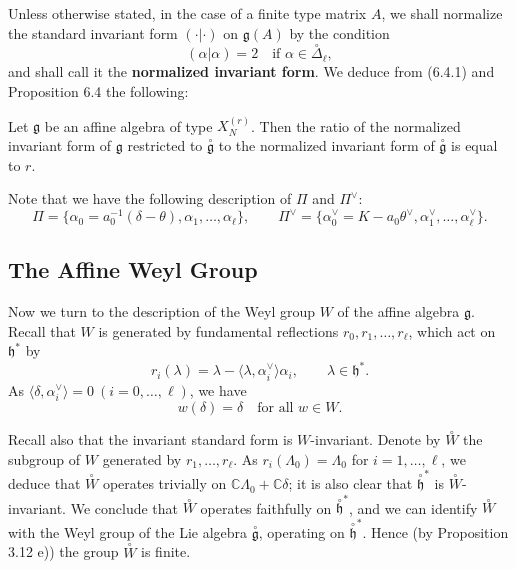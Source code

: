 \documentclass[12pt]{article}
\begin{document}
Unless otherwise stated, in the case of a finite type matrix $A$, we shall 
normalize the standard invariant form $(\cdot|\cdot)$ on $\mathfrak{g}(A)$ by the condition
\begin{equation}
(\alpha|\alpha) = 2 \quad \text{if } \alpha \in \overset{\circ}{\Delta}_\ell,
\tag{6.4.2}
\end{equation}
and shall call it the \textbf{normalized invariant form}. We deduce from (6.4.1) 
and Proposition 6.4 the following:

\begin{corollary}[6.4]
Let $\mathfrak{g}$ be an affine algebra of type $X_N^{(r)}$. Then the ratio 
of the normalized invariant form of $\mathfrak{g}$ restricted to $\overset{\circ}{\mathfrak{g}}$ 
to the normalized invariant form of $\overset{\circ}{\mathfrak{g}}$ is equal to $r$.
\end{corollary}

Note that we have the following description of $\Pi$ and $\Pi^\vee$:
\[
\Pi = \{\alpha_0 = a_0^{-1}(\delta-\theta), \alpha_1, \dots, \alpha_\ell\},
\qquad
\Pi^\vee = \{\alpha_0^\vee = K - a_0 \theta^\vee, \alpha_1^\vee, \dots, \alpha_\ell^\vee\}.
\]



\subsection{The Affine Weyl Group}
Now we turn to the description of the Weyl group $W$ of the affine 
algebra $\mathfrak{g}$. Recall that $W$ is generated by fundamental reflections 
$r_0, r_1, \dots, r_\ell$, which act on $\mathfrak{h}^*$ by
\[
r_i(\lambda) = \lambda - \langle \lambda, \alpha_i^\vee \rangle \alpha_i,
\qquad \lambda \in \mathfrak{h}^*.
\]
As $\langle \delta, \alpha_i^\vee \rangle = 0 \ (i=0,\dots,\ell)$, we have
\[
w(\delta) = \delta \quad \text{for all } w \in W.
\]

Recall also that the invariant standard form is $W$-invariant.  
Denote by $\overset{\circ}{W}$ the subgroup of $W$ generated by $r_1,\dots,r_\ell$. 
As $r_i(\Lambda_0)=\Lambda_0$ for $i=1,\dots,\ell$, we deduce that $\overset{\circ}{W}$ 
operates trivially on $\mathbb{C}\Lambda_0+\mathbb{C}\delta$; it is also clear 
that $\overset{\circ}{\mathfrak{h}}^*$ is $\overset{\circ}{W}$-invariant. We conclude that 
$\overset{\circ}{W}$ operates faithfully on $\overset{\circ}{\mathfrak{h}}^*$, and we can 
identify $\overset{\circ}{W}$ with the Weyl group of the Lie algebra 
$\overset{\circ}{\mathfrak{g}}$, operating on $\overset{\circ}{\mathfrak{h}}^*$. Hence 
(by Proposition 3.12 e)) the group $\overset{\circ}{W}$ is finite.
\end{document}
